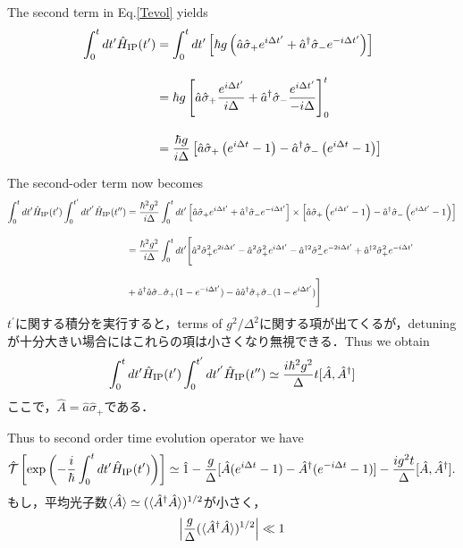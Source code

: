 The second term in Eq.\eqref{Tevol} yields
\begin{align}
    \int_0^{t}dt^\prime \hat{H}_{\rm{IP}}(t^\prime)
    &=\int_0^{t}dt^\prime 
    \left[
    \hbar g \left(
    \hat{a}\hsig_+e^{i\Delta t^\prime}
    +\hat{a}^\dagger\hsig_-e^{-i\Delta t^\prime}
    \right)
    \right]\nn[10pt]
    &=\hbar g
    \left[
    \hat{a}\hsig_+
    \frac{e^{i\Delta t^\prime}}{i\Delta}
    +\hat{a}^\dagger\hsig_-\frac{e^{i\Delta t^\prime}}{-i\Delta}
    \right]_0^t\nn[10pt]
    &=\frac{\hbar g}{i\Delta}
    \left[
    \hat{a}\hsig_+
    \left(e^{i\Delta t}-1\right)
    -\hat{a}^\dagger\hsig_-\left(e^{i\Delta t}-1\right)
    \right]
\end{align}


The second-oder term now becomes
\begin{align}
    \int_0^{t}dt^\prime \hat{H}_{\rm{IP}}(t^\prime)
    \int_0^{t^\prime}dt^{\prime^\prime} \hat{H}_{\rm{IP}}(t^{\prime\prime})
    &=\frac{\hbar^2 g^2}{i\Delta}\int_0^{t}dt^\prime
    \left[
    \hat{a}\hsig_+e^{i\Delta t^\prime}
    +\hat{a}^\dagger\hsig_-e^{-i\Delta t^\prime}
    \right]
    \times
    \left[
    \hat{a}\hsig_+
    \left(e^{i\Delta t^\prime}-1\right)
    -\hat{a}^\dagger\hsig_-\left(e^{i\Delta t^\prime}-1\right)
    \right]\nn[10pt]
    &=\frac{\hbar^2 g^2}{i\Delta}\int_0^{t}dt^\prime
    \Biggl[
    \hat{a}^2\hsig_+^2e^{2i\Delta t^\prime}
    -\hat{a}^2\hsig_+^2e^{i\Delta t^\prime}
    -\hat{a}^{\dagger2}\hsig_-^2e^{-2i\Delta t^\prime}
    +\hat{a}^{\dagger2}\hsig_+^2e^{-i\Delta t^\prime}\nn[10pt]
    &
    +\hat{a}^{\dagger}\hat{a}\hsig_-\hsig_+(1-e^{-i\Delta t^\prime})
    -\hat{a}\hat{a}^{\dagger}\hsig_+\hsig_-(1-e^{i\Delta t^\prime})
    \Biggr]
\end{align}
$t^\prime$に関する積分を実行すると，terms of $g^2/\Delta^2$に関する項が出てくるが，detuningが十分大きい場合にはこれらの項は小さくなり無視できる．Thus we obtain 
\begin{align}
    \int_0^{t}dt^\prime \hat{H}_{\rm{IP}}(t^\prime)
    \int_0^{t^\prime}dt^{\prime^\prime} \hat{H}_{\rm{IP}}(t^{\prime\prime})
    \simeq\frac{i\hbar^2g^2}{\Delta}t[\hat{A}, \hat{A}^\dagger]
\end{align}
ここで，$\hat{A}=\hat{a}\hat{\sigma}_{+}$である．


 Thus to second order time evolution operator we have
\begin{equation}
    \hat{\mathcal{T}}\left[
    \exp{\left(
    -\frac{i}{\hbar}\int_0^t dt^\prime \hat{H}_{\rm{IP}}(t^\prime)
    \right)}
    \right]
    \simeq
    \hat{1}-\frac{g}{\Delta}[\hat{A}(e^{i\Delta t}-1)-\hat{A}^\dagger(e^{-i\Delta t}-1)]
    -\frac{ig^2t}{\Delta}[\hat{A},\hat{A}^\dagger].
\end{equation}
もし，平均光子数$\braket{\hat{A}}\simeq(\braket{\hat{A}^\dag\hat{A}})^{1/2}$が小さく，
\begin{equation}
    \left|
    \frac{g}{\Delta}(\braket{\hat{A}^\dag\hat{A}})^{1/2}
    \right|\ll1
\end{equation}

